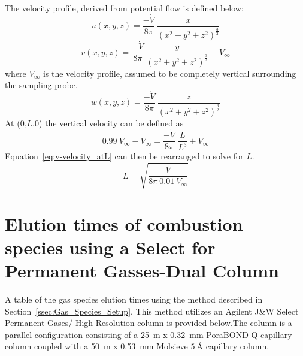 \documentclass[12pt]{article}
\begin{document}
The velocity profile, derived from potential flow is defined below:
\begin{equation}
\label{eq:u-velocity}
u(x,y,z)=\frac{-{\dot{V}}}{8\pi}~\frac{x}{({x^2+y^2+z^2})^{\frac{3}{2}}}
\end{equation}
\begin{equation}
\label{eq:v-velocity}
v(x,y,z)=\frac{-{\dot{V}}}{8\pi}~\frac{y}{({x^2+y^2+z^2})^{\frac{3}{2}}}+V_{\infty}
\end{equation}
where $V_{\infty}$ is the velocity profile, assumed to be completely vertical surrounding the sampling probe.
\begin{equation}
\label{eq:w-velocity}
w(x,y,z)=\frac{-{\dot{V}}}{8\pi}~\frac{z}{({x^2+y^2+z^2})^{\frac{3}{2}}}
\end{equation}
At (0,$L$,0) the vertical velocity can be defined as
\begin{equation}
\label{eq:v-velocity_atL}
0.99~V_{\infty}-V_{\infty}=\frac{-{\dot{V}}}{8\pi}~\frac{L}{L^3}+V_{\infty}
\end{equation}
Equation~\ref{eq:v-velocity_atL} can then be rearranged to solve for $L$.
\begin{equation}
\label{eq:char_length}
L=\sqrt{\frac{{\dot{V}}}{8\pi~0.01~V_{\infty}}}
\end{equation}

\pagebreak

\section{Elution times of combustion species using a Select for Permanent Gasses-Dual Column}\label{sec:Elution Times}

A table of the gas species elution times using the method described in Section~\ref{ssec:Gas_Species_Setup}. This method utilizes an Agilent J\&W Select Permanent Gases/ High-Resolution column is provided below.The column is a parallel configuration consisting of a 25~m x 0.32~mm PoraBOND Q capillary column coupled with a 50~m x 0.53~mm Molsieve $\SI{5}{\angstrom}$ capillary column.
\end{document}
